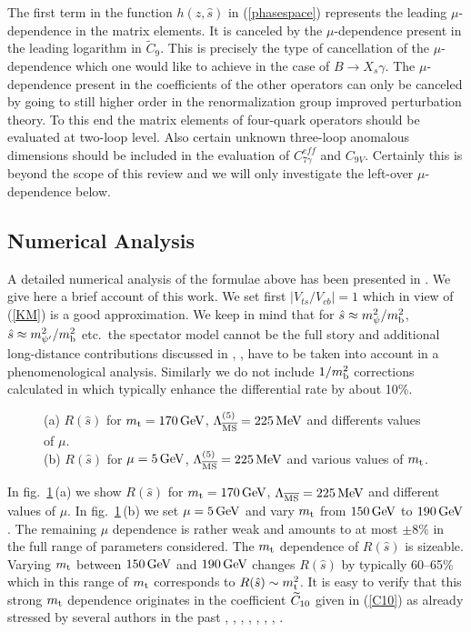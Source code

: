 The first term in the function $h(z, \hat s)$ in (\ref{phasespace})
represents the leading $\mu$-dependence in the matrix elements. It is
canceled by the $\mu$-dependence present in the leading logarithm in
$\tilde C_{9}$. This is precisely the type of cancellation of the
$\mu$-dependence which one would like to achieve in the case of $B \to
X_s \gamma$. The $\mu$-dependence present in the coefficients of
the other operators can only be canceled by going to still higher order
in the renormalization group improved perturbation theory. To this end
the matrix elements of four-quark operators should be evaluated at
two-loop level. Also certain unknown three-loop anomalous dimensions
should be included in the evaluation of $C_{7\gamma}^{eff}$ and
$C_{9V}$. Certainly this is beyond the scope of this review and we will
only investigate the left-over $\mu$-dependence below.

\subsection{Numerical Analysis}
         \label{sec:Heff:BXsee:nlo:num}
A detailed numerical analysis of the formulae above has been presented
in \cite{burasmuenz:95}. We give here a brief account of this work.  We
set first $|V_{ts}/V_{cb}|  = 1$ which in view of (\ref{KM}) is a good
approximation.  We keep in mind that for $\hat s \approx m_\psi^2 /
m_{\rm b}^2$, $\hat s \approx m_{\psi'}^2 / m_{\rm b}^2$ etc.~the spectator model
cannot be the full story and additional long-distance contributions
discussed in \cite{LMS:89}, \cite{DTP:89}, \cite{DT:91} have to be
taken into account in a phenomenological analysis. Similarly we do not
include $1/m_{\rm b}^2$ corrections calculated in \cite{falketal:94} which
typically enhance the differential rate by about 10\%.

\begin{figure}[hbt]
\vspace{0.10in}
\centerline{
\epsfysize=7in
}
\vspace{0.08in}
\caption[]{
(a) $R(\hat{s})$ for $m_{\rm t}=170\, {\rm GeV}$, $\Lambda_{\overline{\rm MS}}^{(5)}=225\, {\rm MeV}$ and differents
values of $\mu$. 
\\
\phantom{xxxxxxxxxx}
(b) $R(\hat{s})$ for $\mu=5\, {\rm GeV}$, $\Lambda_{\overline{\rm MS}}^{(5)}=225\, {\rm MeV}$ and various
values of $m_{\rm t}$. 
\label{fig:bsee:rs}}
\end{figure}

In fig.\ \ref{fig:bsee:rs}\,(a) we show $R(\hat s)$ for $m_{\rm t} = 170 \, {\rm GeV}$,
$\Lambda_{\overline{\rm MS}} = 225 \, {\rm MeV}$ and different values of $\mu$. In fig.\
\ref{fig:bsee:rs}\,(b) we set $\mu = 5 \, {\rm GeV}$ and vary $m_{\rm t}$ from $150 \, {\rm GeV}$
to $190 \, {\rm GeV}$. The remaining $\mu$ dependence is rather weak and
amounts to at most $\pm 8\%$ in the full range of parameters
considered. The $m_{\rm t}$ dependence of $R(\hat s)$ is sizeable. Varying
$m_{\rm t}$ between $150\, {\rm GeV}$ and $190\, {\rm GeV}$ changes $R(\hat s)$ by typically
60--65\% which in this range of $m_{\rm t}$ corresponds to $R(\hat s) \sim
m_{\rm t}^2$. It is easy to verify that this strong $m_{\rm t}$ dependence
originates in the coefficient $\widetilde C_{10}$ given in (\ref{C10}) as
already stressed by several authors in the past \cite{HWS:87},
\cite{grinstein:89a}, \cite{BBMR:91}, \cite{DPT:93}, \cite{GIW:94},
\cite{AGM:94}, \cite{AMM:91}, \cite{JW:90}.

